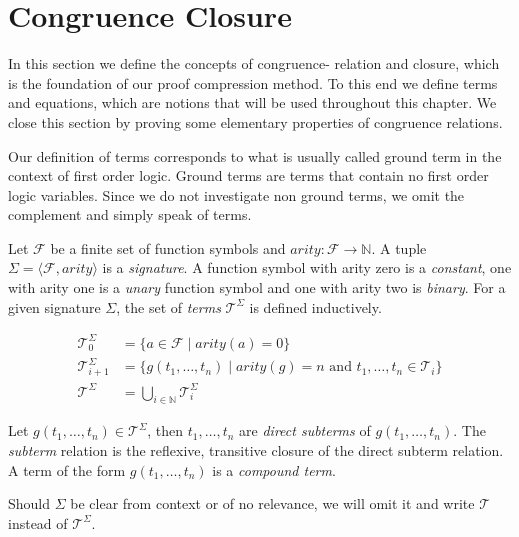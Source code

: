 \section{Congruence Closure}
\label{sec:congruencedef}

In this section we define the concepts of congruence- relation and closure, which is the foundation of our proof compression method.
To this end we define terms and equations, which are notions that will be used throughout this chapter.
We close this section by proving some elementary properties of congruence relations.

Our definition of terms corresponds to what is usually called ground term in the context of first order logic.
Ground terms are terms that contain no first order logic variables.
Since we do not investigate non ground terms, we omit the complement and simply speak of terms.

\begin{definition}

Let $\mathcal{F}$ be a finite set of function symbols and $arity: \mathcal{F} \rightarrow \mathbb{N}$.
A tuple $\Sigma = \langle \mathcal{F}, arity \rangle$ is a \emph{signature}.
A function symbol with arity zero is a \emph{constant}, one with arity one is a \emph{unary} function symbol and one with arity two is \emph{binary}.
For a given signature $\Sigma$, the set of \emph{terms} $\mathcal{T}^{\Sigma}$ is defined inductively.

\begin{align*}
	\mathcal{T}^{\Sigma}_0 &= \{a \in \mathcal{F} \mid arity(a) = 0\}\\
	\mathcal{T}^{\Sigma}_{i+1} &= \{g(t_1,\ldots,t_n) \mid arity(g) = n \text{ and } t_1, \ldots, t_n \in \mathcal{T}_{i}\} \\
	\mathcal{T}^{\Sigma} &= \bigcup_{i\in \mathbb{N}} \mathcal{T}^{\Sigma}_{i}
\end{align*}

\noindent Let $g(t_1,\ldots,t_n) \in \mathcal{T}^{\Sigma}$, then $t_1,\ldots,t_n$ are \emph{direct subterms} of $g(t_1,\ldots,t_n)$.
The \emph{subterm} relation is the reflexive, transitive closure of the direct subterm relation.
A term of the form $g(t_1,\ldots,t_n)$ is a \emph{compound term}.

\end{definition}

\noindent Should $\Sigma$ be clear from context or of no relevance, we will omit it and write $\mathcal{T}$ instead of $\mathcal{T}^{\Sigma}$.

